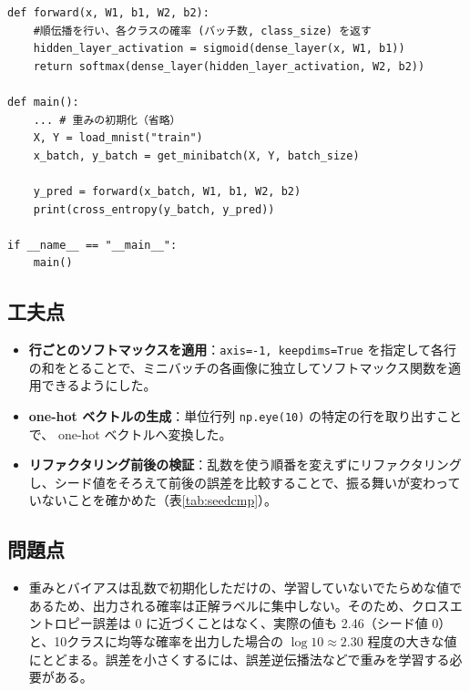 \documentclass[a4paper,11pt]{ltjsarticle}
\begin{document}
\begin{lstlisting}[style=after, caption={【後】順伝播を関数化し、実行部分をmain関数にまとめる}, label=lst:k2a3]
def forward(x, W1, b1, W2, b2):
    #順伝播を行い、各クラスの確率 (バッチ数, class_size) を返す
    hidden_layer_activation = sigmoid(dense_layer(x, W1, b1))
    return softmax(dense_layer(hidden_layer_activation, W2, b2))

def main():
    ... # 重みの初期化（省略）
    X, Y = load_mnist("train")
    x_batch, y_batch = get_minibatch(X, Y, batch_size)

    y_pred = forward(x_batch, W1, b1, W2, b2)
    print(cross_entropy(y_batch, y_pred))

if __name__ == "__main__":
    main()
\end{lstlisting}

\subsection{工夫点}
\begin{itemize}
  \item \textbf{行ごとのソフトマックスを適用}：\texttt{axis=-1, keepdims=True} を指定して各行の和をとることで、ミニバッチの各画像に独立してソフトマックス関数を適用できるようにした。
  \item \textbf{one-hot ベクトルの生成}：単位行列 \texttt{np.eye(10)} の特定の行を取り出すことで、 one-hot ベクトルへ変換した。
  \item \textbf{リファクタリング前後の検証}：乱数を使う順番を変えずにリファクタリングし、シード値をそろえて前後の誤差を比較することで、振る舞いが変わっていないことを確かめた（表\ref{tab:seedcmp}）。
\end{itemize}

\subsection{問題点}
\begin{itemize}
  \item 重みとバイアスは乱数で初期化しただけの、学習していないでたらめな値であるため、出力される確率は正解ラベルに集中しない。そのため、クロスエントロピー誤差は 0 に近づくことはなく、実際の値も 2.46（シード値 0）と、10クラスに均等な確率を出力した場合の $\log 10 \approx 2.30$ 程度の大きな値にとどまる。誤差を小さくするには、誤差逆伝播法などで重みを学習する必要がある。
\end{itemize}
\end{document}
